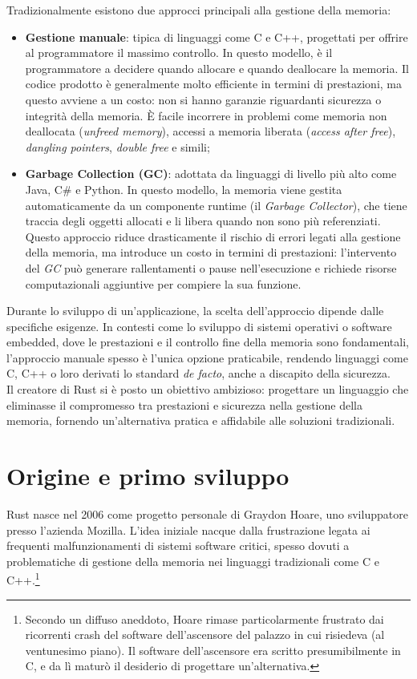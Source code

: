 Tradizionalmente esistono due approcci principali alla gestione della memoria:
\begin{itemize}
    \item \textbf{Gestione manuale}: tipica di linguaggi come C e C++, progettati per offrire al programmatore il massimo controllo. In questo modello, è il programmatore a decidere quando allocare e quando deallocare la memoria. Il codice prodotto è generalmente molto efficiente in termini di prestazioni, ma questo avviene a un costo: non si hanno garanzie riguardanti sicurezza o integrità della memoria. È facile incorrere in problemi come memoria non deallocata (\textit{unfreed memory}), accessi a memoria liberata (\textit{access after free}), \textit{dangling pointers}, \textit{double free} e simili;
    \item \textbf{Garbage Collection (GC)}: adottata da linguaggi di livello più alto come Java, C\# e Python. In questo modello, la memoria viene gestita automaticamente da un componente runtime (il \textit{Garbage Collector}), che tiene traccia degli oggetti allocati e li libera quando non sono più referenziati. Questo approccio riduce drasticamente il rischio di errori legati alla gestione della memoria, ma introduce un costo in termini di prestazioni: l'intervento del \textit{GC} può generare rallentamenti o pause nell'esecuzione e richiede risorse computazionali aggiuntive per compiere la sua funzione.
\end{itemize}
Durante lo sviluppo di un'applicazione, la scelta dell'approccio dipende dalle specifiche esigenze.
In contesti come lo sviluppo di sistemi operativi o software embedded, dove le prestazioni e il controllo fine della memoria sono fondamentali, l'approccio
manuale spesso è l'unica opzione praticabile, rendendo linguaggi come C, C++ o loro derivati lo standard \textit{de facto}, anche a discapito della sicurezza. \hfill
\vspace{15pt}\\
Il creatore di Rust si è posto un obiettivo ambizioso: progettare un linguaggio che eliminasse il compromesso tra prestazioni e sicurezza nella gestione della memoria, fornendo un'alternativa pratica e affidabile alle soluzioni tradizionali.

\section{Origine e primo sviluppo}
Rust nasce nel 2006 come progetto personale di Graydon Hoare, uno sviluppatore presso l'azienda Mozilla.
L'idea iniziale nacque dalla frustrazione legata ai frequenti malfunzionamenti di sistemi software critici, spesso dovuti a problematiche di gestione della memoria nei linguaggi tradizionali come C e C++.\footnote{Secondo un diffuso aneddoto, Hoare rimase particolarmente frustrato dai
ricorrenti crash del software dell'ascensore del palazzo in cui risiedeva (al ventunesimo piano). Il software dell'ascensore era scritto presumibilmente 
in C, e da lì maturò il desiderio di progettare un'alternativa.}

